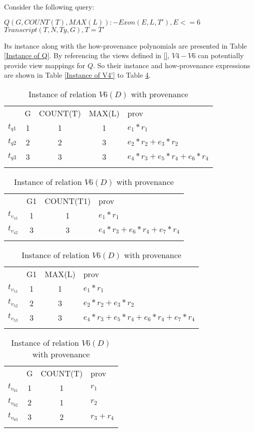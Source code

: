 \begin{example}
Consider the following query:
\begin{tabbing}
$Q(G, COUNT(T), MAX(L)):-Exon(E, L, T'), E <= 6$\\
\tab\tab\tab\tab$Transcript(T, N, Ty, G), T = T'$
\end{tabbing}

Its instance along with the how-provenance polynomials are presented in Table \ref{Instance of Q}. By referencing the views defined in \ref{}, $V4-V6$ can potentially provide view mappings for $Q$. So their instance and how-provenance expressions are shown in Table \ref{Instance of V4'} to Table \ref{Instance of V6'}.

\begin{table}[htp]
\centering
\small
\caption{$Q(D)$ with how-provenance polynomials}\label{Instance of Q}
\begin{tabular}[t]{c|c|c|c||b|} \hhline{~----}
&G&COUNT(T)&MAX(L)&prov\\ \hhline{~----}
$t_{q1}$&1&1&1&$e_1*r_1$\\ \hhline{~----}
$t_{q2}$&2&2&3&$e_2*r_2 + e_3*r_2$\\ \hhline{~----}
$t_{q3}$&3&3&3&$e_4*r_3 + e_5*r_4 + e_6*r_4$\\ \hhline{~----}
\end{tabular}
\bigskip
\caption{$V_4(D)$ with how-provenance polynomials}\label{Instance of V4'}
\begin{tabular}[t]{c|c|c||b|} \hhline{~---}
&G1&COUNT(T1)&prov\\ \hhline{~---}
$t_{v_41}$&1&1&$e_1*r_1$\\ \hhline{~---}
$t_{v_42}$&3&3&$e_4*r_3 + e_6*r_4 + e_7*r_4$\\ \hhline{~---}
\end{tabular}
\bigskip
\caption{$V_5(D)$ with how-provenance polynomials}\label{Instance of V5'}
\begin{tabular}[t]{c|c|c||b|} \hhline{~---}
&G1&MAX(L)&prov\\ \hhline{~---}
$t_{v_51}$&1&1&$e_1*r_1$\\ \hhline{~---}
$t_{v_52}$&2&3&$e_2*r_2 + e_3*r_2$\\ \hhline{~---}
$t_{v_53}$&3&3&$e_4*r_3 + e_5*r_4 + e_6*r_4 + e_7*r_4$\\ \hhline{~---}
\end{tabular}
\bigskip
\caption{Instance of relation $V6(D)$ with provenance}\label{Instance of V6'}
\begin{tabular}[t]{c|c|c||b|} \hhline{~---}
&G&COUNT(T)&prov\\ \hhline{~---}
$t_{v_61}$&1&1&$r_1$\\ \hhline{~---}
$t_{v_62}$&2&1&$r_2$\\ \hhline{~---}
$t_{v_63}$&3&2&$r_3 + r_4$\\ \hhline{~---}
\end{tabular}



\end{table}
\end{example}
